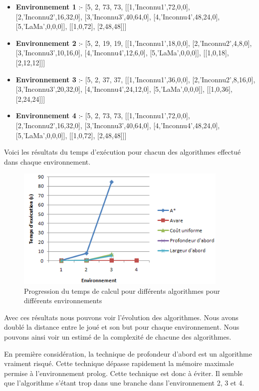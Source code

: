 \documentclass[12pt,english,frenchb,letterpaper]{article}
\begin{document}
\begin{itemize}
\item 
\textbf{Environnement 1} :- 
[5, 2, 73, 73, [[1,'Inconnu1',72,0,0], [2,'Inconnu2',16,32,0], [3,'Inconnu3',40,64,0], [4,'Inconnu4',48,24,0], [5,'LaMa',0,0,0]], [[1,0,72], [2,48,48]]]
\item 
\textbf{Environnement 2} :- 
[5, 2, 19, 19, [[1,'Inconnu1',18,0,0], [2,'Inconnu2',4,8,0], [3,'Inconnu3',10,16,0], [4,'Inconnu4',12,6,0], [5,'LaMa',0,0,0]], [[1,0,18], [2,12,12]]]
\item 
\textbf{Environnement 3} :- 
[5, 2, 37, 37, [[1,'Inconnu1',36,0,0], [2,'Inconnu2',8,16,0], [3,'Inconnu3',20,32,0], [4,'Inconnu4',24,12,0], [5,'LaMa',0,0,0]], [[1,0,36], [2,24,24]]]
\item 
\textbf{Environnement 4} :- 
[5, 2, 73, 73, [[1,'Inconnu1',72,0,0], [2,'Inconnu2',16,32,0], [3,'Inconnu3',40,64,0], [4,'Inconnu4',48,24,0], [5,'LaMa',0,0,0]], [[1,0,72], [2,48,48]]]
\end{itemize}


Voici les résultats du temps d'exécution pour chacun des algorithmes effectué dans chaque environnement.

\begin{figure}[!h] %
\includegraphics[width=4in]{resultats-planif} %
\caption{Progression du temps de calcul pour différents algorithmes pour différents environnements} 
\end{figure}

Avec ces résultats nous pouvons voir l'évolution des algorithmes. Nous avons doublé la distance entre le joué et son but pour chaque environnement. Nous pouvons ainsi voir un estimé de la complexité de chacune des algorithmes.

En première considération, la technique de profondeur d'abord est un algorithme vraiment risqué. Cette technique dépasse rapidement la mémoire maximale permise à l'environnement prolog. Cette technique est donc à éviter. Il semble que l'algorithme s'étant trop dans une branche dans l'environnement 2, 3 et 4.
\end{document}
